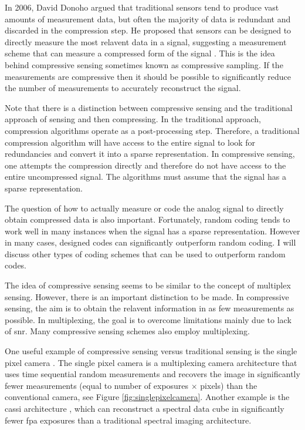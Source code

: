 In 2006, David Donoho argued that traditional sensors tend to produce vast amounts of measurement data, but often the majority of data is redundant and discarded in the compression step. He proposed that sensors can be designed to directly measure the most relavent data in a signal, suggesting a measurement scheme that can measure a compressed form of the signal \cite{donoho2006compressed}. This is the idea behind \gls{compressive sensing} sometimes known as \gls{compressive sampling}. If the measurements are compressive then it should be possible to significantly reduce the number of measurements to accurately reconstruct the signal. 

Note that there is a distinction between compressive sensing and the traditional approach of sensing and then compressing. In the traditional approach, compression algorithms operate as a post-processing step. Therefore, a traditional compression algorithm will have access to the entire signal to look for redundancies and convert it into a sparse representation. In compressive sensing, one attempts the compression directly and therefore do not have access to the entire uncompressed signal. The algorithms must assume that the signal has a sparse representation. 

The question of how to actually measure or code the analog signal to directly obtain compressed data is also important. Fortunately, random coding tends to work well in many instances when the signal has a sparse representation. However in many cases, designed codes can significantly outperform random coding. I will discuss other types of coding schemes that can be used to outperform random codes. 

The idea of compressive sensing seems to be similar to the concept of multiplex sensing. However, there is an important distinction to be made. In compressive sensing, the aim is to obtain the relavent information in as few measurements as possible. In multiplexing, the goal is to overcome limitations mainly due to lack of \gls{snr}. Many compressive sensing schemes also employ multiplexing.

One useful example of compressive sensing versus traditional sensing is the single pixel camera \cite{duarte2008single}. The single pixel camera is a multiplexing camera architecture that uses time sequential random measurements and recovers the image in significantly fewer measurements (equal to number of exposures $\times$ pixels) than the conventional camera, see Figure \ref{fig:singlepixelcamera}. Another example is the \gls{cassi} architecture \cite{wagadarikar2008single}, which can reconstruct a spectral data cube in significantly fewer \gls{fpa} exposures than a traditional spectral imaging architecture. 


